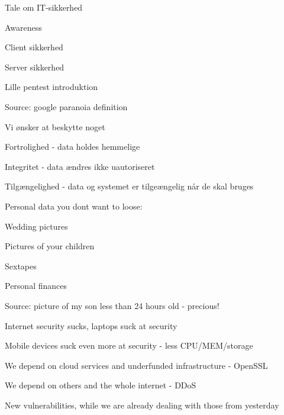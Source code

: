 \documentclass[20pt,landscape,a4paper,footrule]{foils}
\begin{document}




\begin{list1}
\item Tale om IT-sikkerhed
\item Awareness
\item Client sikkerhed
\item Server sikkerhed
\item Lille pentest introduktion
\end{list1}




Source: google paranoia definition



\begin{list1}
\item Vi ønsker at beskytte noget
\item Fortrolighed - data holdes hemmelige
\item Integritet - data ændres ikke uautoriseret
\item Tilgængelighed - data og systemet er tilgeængelig når de skal bruges
\end{list1}


\begin{list1}
\item Personal data you dont want to loose:
\begin{list2}
\item Wedding pictures
\item Pictures of your children
\item Sextapes
\item Personal finances
\end{list2}
\end{list1}

Source: picture of my son less than 24 hours old - precious!



\begin{list1}
\item Internet security sucks, laptops suck at security
\item Mobile devices suck even more at security - less CPU/MEM/storage
\item We depend on cloud services and underfunded infrastructure - OpenSSL
\item We depend on others and the whole internet - DDoS
\item New vulnerabilities, while we are already dealing with those from yesterday
\end{list1}
\end{document}
